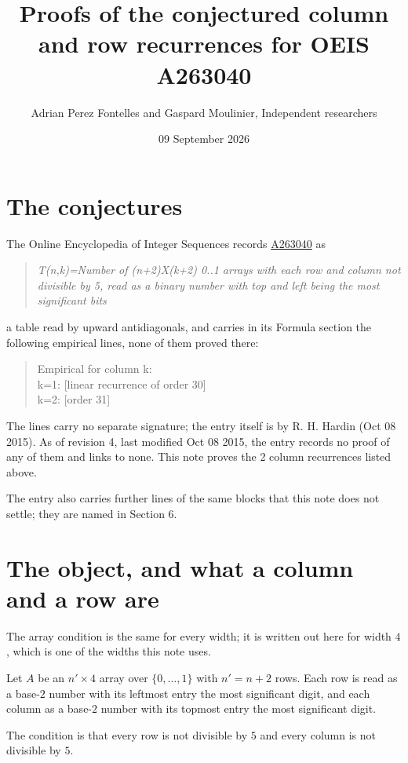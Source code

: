 \documentclass[11pt]{article}
\title{Proofs of the conjectured column and row recurrences for OEIS A263040}
\author{Adrian Perez Fontelles and Gaspard Moulinier, Independent researchers}
\date{09 September 2026}
\theoremstyle{definition}
\begin{document}
\maketitle
\section{The conjectures}

The Online Encyclopedia of Integer Sequences records \href{https://oeis.org/A263040}{A263040} as

\begin{quote}\itshape T(n,k)=Number of (n+2)X(k+2) 0..1 arrays with each row and column not divisible by 5, read as a binary number with top and left being the most significant bits\end{quote}

a table read by upward antidiagonals, and carries in its Formula section the following empirical lines, none of them proved there:

\begin{quote}\ttfamily Empirical for column k:\\
k=1: [linear recurrence of order 30]\\k=2: [order 31]\end{quote}

The lines carry no separate signature; the entry itself is by R. H. Hardin (Oct 08 2015). As of revision 4, last modified Oct 08 2015, the entry records no proof of any of them and links to none. This note proves the 2 column recurrences listed above.

The entry also carries further lines of the same blocks that this note does not settle; they are named in Section 6.

\section{The object, and what a column and a row are}

The array condition is the same for every width; it is written out here for width $4$, which is one of the widths this note uses.

Let $A$ be an $n' \times 4$ array over $\{0,\dots,1\}$ with $n' = n + 2$ rows. Each row is read as a base-$2$ number with its leftmost entry the most significant digit, and each column as a base-$2$ number with its topmost entry the most significant digit.

The condition is that every row is not divisible by $5$ and every column is not divisible by $5$.
\end{document}
